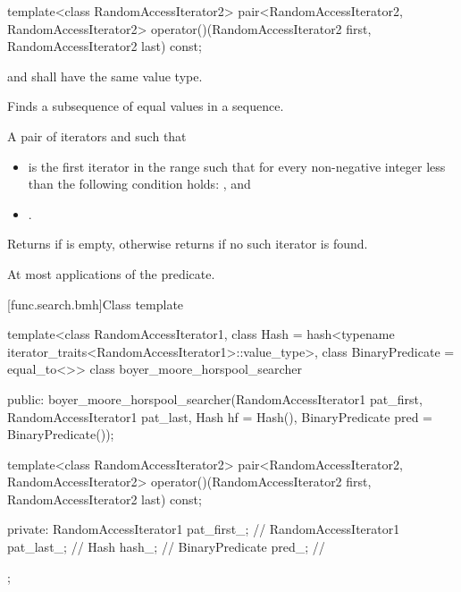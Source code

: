 %
\begin{itemdecl}
template<class RandomAccessIterator2>
  pair<RandomAccessIterator2, RandomAccessIterator2>
    operator()(RandomAccessIterator2 first, RandomAccessIterator2 last) const;
\end{itemdecl}

\begin{itemdescr}
\pnum
\requires
{} and  shall have the same value type.

\pnum
\effects
Finds a subsequence of equal values in a sequence.

\pnum
\returns
A pair of iterators  and  such that
\begin{itemize}
\item {} is the first iterator
in the range  such that
for every non-negative integer  less than 
the following condition holds:
, and
\item {}.
\end{itemize}
Returns  if  is empty,
otherwise returns  if no such iterator is found.

\pnum
\complexity
At most  applications of the predicate.
\end{itemdescr}

[func.search.bmh]{Class template }

%
\begin{codeblock}
template<class RandomAccessIterator1,
         class Hash = hash<typename iterator_traits<RandomAccessIterator1>::value_type>,
         class BinaryPredicate = equal_to<>>
  class boyer_moore_horspool_searcher {
  public:
    boyer_moore_horspool_searcher(RandomAccessIterator1 pat_first,
                                  RandomAccessIterator1 pat_last,
                                  Hash hf = Hash(),
                                  BinaryPredicate pred = BinaryPredicate());

    template<class RandomAccessIterator2>
      pair<RandomAccessIterator2, RandomAccessIterator2>
        operator()(RandomAccessIterator2 first, RandomAccessIterator2 last) const;

  private:
    RandomAccessIterator1 pat_first_;   // \expos
    RandomAccessIterator1 pat_last_;    // \expos
    Hash hash_;                         // \expos
    BinaryPredicate pred_;              // \expos
  };
\end{codeblock}

